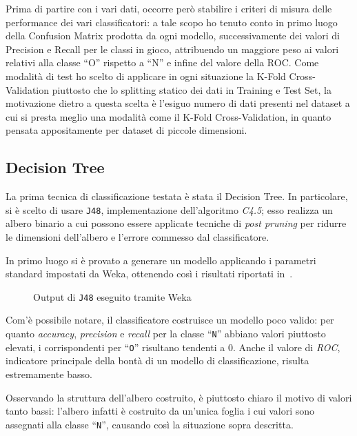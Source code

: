 
Prima di partire con i vari dati, occorre però stabilire i criteri di misura delle performance dei vari classificatori:
a tale scopo ho tenuto conto in primo luogo della Confusion Matrix prodotta da ogni modello, successivamente dei valori di Precision e Recall per le classi in gioco, attribuendo un maggiore peso ai valori relativi alla classe ``O'' rispetto a ``N'' e infine del valore della ROC\@.
Come modalità di test ho scelto di applicare in ogni situazione la K-Fold Cross-Validation piuttosto che lo splitting statico dei dati in Training e Test Set, la motivazione dietro a questa scelta è l'esiguo numero di dati presenti nel dataset a cui si presta meglio una modalità come il K-Fold Cross-Validation,
in quanto pensata appositamente per dataset di piccole dimensioni.


\subsection{Decision Tree}

La prima tecnica di classificazione testata è stata il Decision Tree.
In particolare, si è scelto di usare \texttt{J48}, implementazione dell'algoritmo \emph{C4.5};
esso realizza un albero binario a cui possono essere applicate tecniche di \emph{post pruning}
per ridurre le dimensioni dell'albero e l'errore commesso dal classificatore.

In primo luogo si è provato a generare un modello applicando i parametri standard impostati da Weka, ottenendo così i risultati riportati in~.

\begin{figure}[H]
  \centering
  \caption{Output di \texttt{J48} eseguito tramite Weka}%
  \label{fig:j48}
\end{figure}

Com'è possibile notare, il classificatore costruisce un modello poco valido:
per quanto \emph{accuracy}, \emph{precision} e \emph{recall} per la classe ``\texttt{N}'' abbiano valori piuttosto elevati,
i corrispondenti per ``\texttt{O}'' risultano tendenti a \(0\).
Anche il valore di \emph{ROC}, indicatore principale della bontà di un modello di classificazione, risulta estremamente basso.

Osservando la struttura dell'albero costruito, è piuttosto chiaro il motivo di valori tanto bassi:
l'albero infatti è costruito da un'unica foglia i cui valori sono assegnati alla classe ``\texttt{N}'', causando così la situazione sopra descritta.

